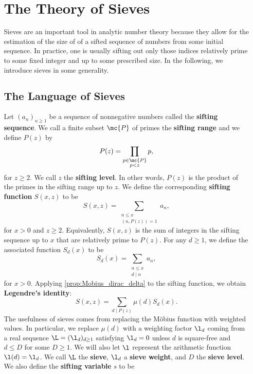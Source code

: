 \chapter{The Theory of Sieves}
  Sieves are an important tool in analytic number theory because they allow for the estimation of the size of of a sifted sequence of numbers from some initial sequence. In practice, one is usually sifting out only those indices relatively prime to some fixed integer and up to some prescribed size. In the following, we introduce sieves in some generality.
  \section{The Language of Sieves}
    Let $(a_{n})_{n \ge 1}$ be a sequence of nonnegative numbers called the \textbf{sifting sequence}. We call a finite subset $\mc{P}$ of primes the \textbf{sifting range} and we define $P(z)$ by
    \[
      P(z) = \prod_{\substack{p \in \mc{P} \\ p < z}}p,
    \]
    for $z \ge 2$. We call $z$ the \textbf{sifting level}. In other words, $P(z)$ is the product of the primes in the sifting range up to $z$. We define the corresponding \textbf{sifting function} $S(x,z)$ to be
    \[
      S(x,z) = \sum_{\substack{n \le x \\ (n,P(z)) = 1}}a_{n},
    \]
    for $x > 0$ and $z \ge 2$. Equivalently, $S(x,z)$ is the sum of integers in the sifting sequence up to $x$ that are relatively prime to $P(z)$. For any $d \ge 1$, we define the associated function $S_{d}(x)$ to be
    \[
      S_{d}(x) = \sum_{\substack{n \le x \\ d \mid n}}a_{n},
    \]
    for $x > 0$. Applying \cref{prop:Mobius_dirac_delta} to the sifting function, we obtain \textbf{Legendre's identity}:
    \[
      S(x,z) = \sum_{d \mid P(z)}\mu(d)S_{d}(x).
    \]
    The usefulness of sieves comes from replacing the M\"obius function with weighted values. In particular, we replace $\mu(d)$ with a weighting factor $\l_{d}$ coming from a real sequence $\L = (\l_{d})_{d \ge 1}$ satisfying $\l_{d} = 0$ unless $d$ is square-free and $d \le D$ for some $D \ge 1$. We will also let $\l$ represent the arithmetic function $\l(d) = \l_{d}$. We call $\L$ the \textbf{sieve}, $\l_{d}$ a \textbf{sieve weight}, and $D$ the \textbf{sieve level}. We also define the \textbf{sifting variable} $s$ to be
